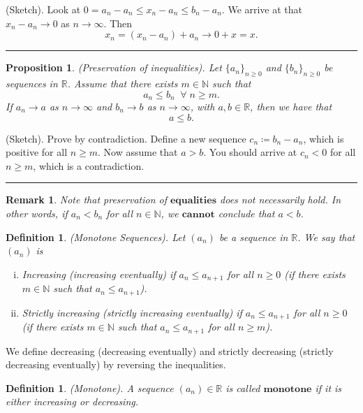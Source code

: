 \documentclass[twoside]{article}
\newtheorem{proposition}[theorem]{Proposition}
\newtheorem{remark}[theorem]{Remark}
\newtheorem{definition}[theorem]{Definition}
\newenvironment{proof}{{\bf Proof:}}{\hfill\rule{2mm}{2mm}}
\begin{document}
\begin{proof}
(Sketch). Look at $0 = a_n - a_n \leq x_n - a_n \leq b_n - a_n$. We arrive at that $x_n - a_n \rightarrow 0$ as $n \rightarrow \infty$. Then
$$
x_n = (x_n - a_n) + a_n \rightarrow 0 + x = x.
$$
\end{proof}

\begin{proposition}
 (Preservation of inequalities). Let $\{a_n\}_{n \geq 0}$ and $\{b_n\}_{n \geq 0}$ be sequences in $\mathbb{R}$. Assume that there exists $m \in \mathbb{N}$ such that
 $$
 a_n \leq b_n \;\; \forall \; n \geq m.
 $$
 If $a_n \rightarrow a$ as $n \rightarrow \infty$ and $b_n \rightarrow b$ as $n \rightarrow \infty$, with $a,b \in \mathbb{R}$, then we have that
 $$
 a \leq b.
 $$
\end{proposition}

\begin{proof}
(Sketch). Prove by contradiction. Define a new sequence $c_n \coloneqq b_n - a_n$, which is positive for all $n \geq m$. Now assume that $a > b$. You should arrive at $c_n < 0$ for all $n \geq m$, which is a contradiction.
\end{proof}

\begin{remark}
Note that preservation of $\textbf{equalities}$ does not necessarily hold. In other words, if $a_n < b_n$ for all $n \in \mathbb{N}$, we $\textbf{cannot}$ conclude that $a < b$.
\end{remark}

\begin{definition}
(Monotone Sequences). Let $(a_n)$ be a sequence in $\mathbb{R}$. We say that $(a_n)$ is
\begin{enumerate}[(i)]
  \item Increasing (increasing eventually) if $a_n \leq a_{n+1}$ for all $n \geq 0$ (if there exists $m \in \mathbb{N}$ such that $a_n \leq a_{n+1}$).
  \item Strictly increasing (strictly increasing eventually) if $a_n \leq a_{n+1}$ for all $n \geq 0$ (if there exists $m \in \mathbb{N}$ such that $a_n \leq a_{n+1}$ for all $n \geq m$).
\end{enumerate}
\end{definition}

We define decreasing (decreasing eventually) and strictly decreasing (strictly decreasing eventually) by reversing the inequalities.

\begin{definition}
(Monotone). A sequence $(a_n) \in \mathbb{R}$ is called $\textbf{monotone}$ if it is either increasing or decreasing.
\end{definition}
\end{document}
